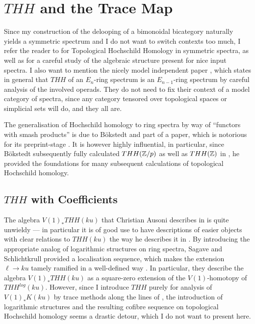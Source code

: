 \chapter{$THH$ and the Trace Map}\label{THHundtr}
Since my construction of the delooping of a bimonoidal bicategory 
naturally yields a symmetric spectrum and I do not want to switch 
contexts too much, I refer the reader to \cite{ShTHH} for Topological 
Hochschild Homology in symmetric spectra, as well as
\cite{AnR} for a careful study of the algebraic 
structure present for nice input spectra. I also want to mention 
the nicely model independent paper \cite{BFV}, which states 
in general that $THH$ of an $E_n$-ring spectrum is an $E_{n-1}$-ring 
spectrum by careful analysis of the involved operads. They do not 
need to fix their context of a model category of spectra, since any 
category tensored over topological spaces or simplicial sets will do, 
and they all are.

The generalisation of Hochschild homology to ring spectra by way of ``functors
with smash products'' is due to B\"okstedt and part of a paper, which is
notorious for its preprint-stage \cite{B1}. It is however highly influential, in particular,
since B\"okstedt subsequently fully calculated $THH(\mathbb{Z}/p)$ as well as 
$THH(\mathbb{Z})$ in \cite{B2}, he provided the foundations for many subsequent 
calculations of topological Hochschild homology.

\section{$THH$ with Coefficients}
The algebra $V(1)_*THH(ku)$ that Christian Ausoni describes in 
\cite{AuTHH} is quite unwieldy --- in particular it is of good
use to have descriptions of easier objects with clear relations
to $THH(ku)$ the way he describes it in \cite{AuTHH}. 
By introducing the appropriate analog of logarithmic structures 
on ring spectra, Sagave and Schlichtkrull provided a localisation 
sequence, which makes the extension $\ell\rightarrow ku$ tamely 
ramified in a well-defined way \cite{SaSch14}. In particular, they 
describe the algebra $V(1)_*THH(ku)$ as a square-zero extension 
of the $V(1)$-homotopy of $THH^{log}(ku)$. However, since I 
introduce $THH$ purely for analysis of $V(1)_*K(ku)$ by trace 
methods along the lines of \cite{AuTHH,AuKku}, the introduction of 
logarithmic structures and the resulting cofibre sequence on 
topological Hochschild homology seems a drastic detour, which 
I do not want to present here.

